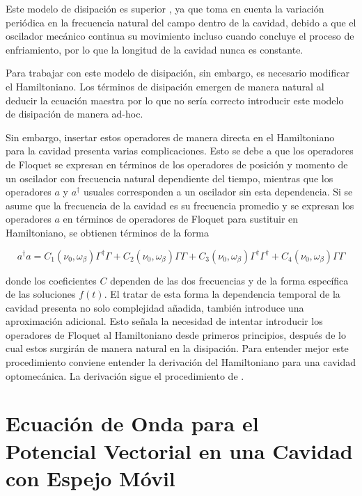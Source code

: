 \documentclass[10pt,a4paper]{report}
\begin{document}
Este modelo de disipación es superior \cite{HanngiFM}, ya que toma en cuenta la variación periódica en la frecuencia natural del campo dentro de la cavidad, debido a que el oscilador mecánico continua su movimiento incluso cuando concluye el proceso de enfriamiento, por lo que la longitud de la cavidad nunca es constante.

Para trabajar con este modelo de disipación, sin embargo, es necesario modificar el Hamiltoniano. Los términos de disipación emergen de manera natural al deducir la ecuación maestra por lo que no sería correcto introducir este modelo de disipación de manera ad-hoc.  

Sin embargo, insertar estos operadores  de manera directa en el Hamiltoniano para la cavidad presenta varias complicaciones. Esto se debe a que los operadores de Floquet se expresan en términos de los operadores de posición y momento de un oscilador con frecuencia natural dependiente del tiempo, mientras que los operadores $a$ y $a^\dagger$ usuales corresponden a un oscilador sin esta dependencia. Si se asume que la frecuencia de la cavidad es su
frecuencia promedio y se expresan los operadores $a$ en términos de operadores de Floquet para sustituir en Hamiltoniano, se obtienen términos de la forma

\begin{equation}
a^\dagger a = C_1 (\nu_0, \omega_\beta)\Gamma^\dagger \Gamma + C_2(\nu_0, \omega_\beta) \Gamma \Gamma + C_3(\nu_0, \omega_\beta) \Gamma^\dagger \Gamma^\dagger +C_4(\nu_0, \omega_\beta) \Gamma \Gamma
\end{equation}

donde los coeficientes $C$ dependen de las dos frecuencias y de la
forma específica de las soluciones $f(t)$. El tratar de esta forma la
dependencia temporal de la cavidad presenta no solo complejidad añadida, también introduce una aproximación adicional. Esto señala la necesidad de intentar introducir los operadores de Floquet al Hamiltoniano desde primeros principios, después de lo cual
estos surgirán de manera natural en la disipación. Para entender mejor este procedimiento conviene entender la derivación del Hamiltoniano para una cavidad optomecánica. La derivación sigue el procedimiento de \cite{LawOH}.

\section{Ecuación de Onda para el Potencial Vectorial en una Cavidad con Espejo Móvil}
\end{document}
